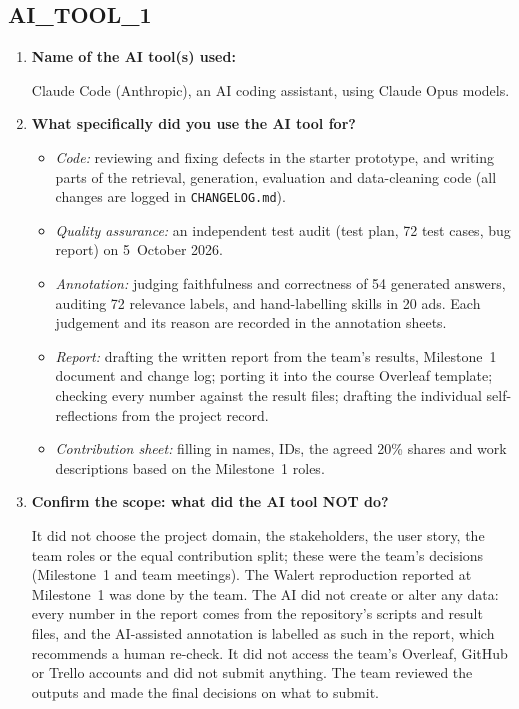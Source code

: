 \documentclass[manuscript,screen,nonacm]{acmart}
\begin{document}
\subsection*{AI\_TOOL\_1}
\begin{enumerate}
    \item \textbf{Name of the AI tool(s) used:}

    \vspace{0.5em}
    \noindent Claude Code (Anthropic), an AI coding assistant, using Claude Opus models.

    \vspace{1.5em}
    \item \textbf{What specifically did you use the AI tool for?}

    \vspace{0.5em}
    \begin{itemize}
      \item \emph{Code:} reviewing and fixing defects in the starter prototype, and writing parts of the retrieval, generation, evaluation and data-cleaning code (all changes are logged in \texttt{CHANGELOG.md}).
      \item \emph{Quality assurance:} an independent test audit (test plan, 72 test cases, bug report) on 5~October 2026.
      \item \emph{Annotation:} judging faithfulness and correctness of 54 generated answers, auditing 72 relevance labels, and hand-labelling skills in 20 ads. Each judgement and its reason are recorded in the annotation sheets.
      \item \emph{Report:} drafting the written report from the team's results, Milestone~1 document and change log; porting it into the course Overleaf template; checking every number against the result files; drafting the individual self-reflections from the project record.
      \item \emph{Contribution sheet:} filling in names, IDs, the agreed 20\% shares and work descriptions based on the Milestone~1 roles.
    \end{itemize}

    \vspace{1.5em}
    \item \textbf{Confirm the scope: what did the AI tool NOT do?}

    \vspace{0.5em}
    \noindent It did not choose the project domain, the stakeholders, the user story, the team roles or the equal contribution split; these were the team's decisions (Milestone~1 and team meetings). The Walert reproduction reported at Milestone~1 was done by the team. The AI did not create or alter any data: every number in the report comes from the repository's scripts and result files, and the AI-assisted annotation is labelled as such in the report, which recommends a human re-check. It did not access the team's Overleaf, GitHub or Trello accounts and did not submit anything. The team reviewed the outputs and made the final decisions on what to submit.
\end{enumerate}
\end{document}
